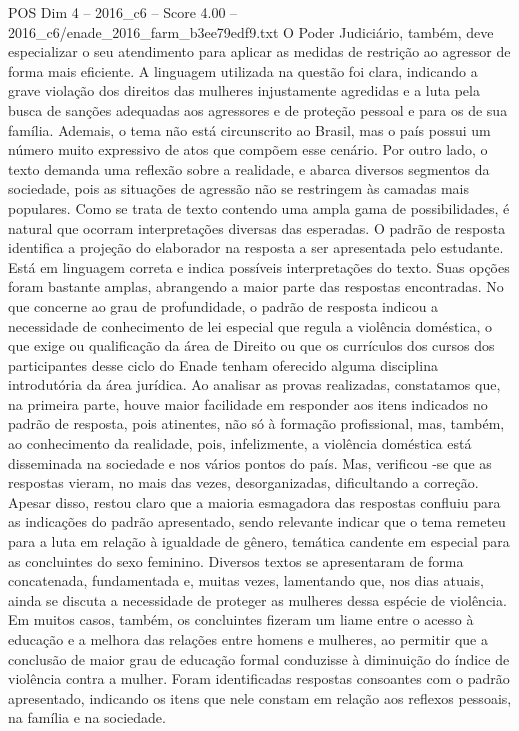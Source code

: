 \begin{textsample}{POS Dim 4 – 2016\_c6 – Score 4.00 – 2016\_c6/enade\_2016\_farm\_b3ee79edf9.txt}
O Poder Judiciário, também, deve especializar o seu atendimento para aplicar as medidas de restrição ao agressor de forma mais eficiente.
A linguagem utilizada na questão foi clara, indicando a grave violação dos direitos das mulheres injustamente agredidas e a luta pela busca de sanções adequadas aos agressores e de proteção pessoal e para os de sua família.
Ademais, o tema não está circunscrito ao Brasil, mas o país possui um número muito expressivo de atos que compõem esse cenário.
Por outro lado, o texto demanda uma reflexão sobre a realidade, e abarca diversos segmentos da sociedade, pois as situações de agressão não se restringem às camadas mais populares.
Como se trata de texto contendo uma ampla gama de possibilidades, é natural que ocorram interpretações diversas das esperadas.
O padrão de resposta identifica a projeção do elaborador na resposta a ser apresentada pelo estudante.
Está em linguagem correta e indica possíveis interpretações do texto.
Suas opções foram bastante amplas, abrangendo a maior parte das respostas encontradas.
No que concerne ao grau de profundidade, o padrão de resposta indicou a necessidade de conhecimento de lei especial que regula a violência doméstica, o que exige ou qualificação da área de Direito ou que os currículos dos cursos dos participantes desse ciclo do Enade tenham oferecido alguma disciplina introdutória da área jurídica.
Ao analisar as provas realizadas, constatamos que, na primeira parte, houve maior facilidade em responder aos itens indicados no padrão de resposta, pois atinentes, não só à formação profissional, mas, também, ao conhecimento da realidade, pois, infelizmente, a violência doméstica está disseminada na sociedade e nos vários pontos do país.
Mas, verificou -se que as respostas vieram, no mais das vezes, desorganizadas, dificultando a correção.
Apesar disso, restou claro que a maioria esmagadora das respostas confluiu para as indicações do padrão apresentado, sendo relevante indicar que o tema remeteu para a luta em relação à igualdade de gênero, temática candente em especial para as concluintes do sexo feminino.
Diversos textos se apresentaram de forma concatenada, fundamentada e, muitas vezes, lamentando que, nos dias atuais, ainda se discuta a necessidade de proteger as mulheres dessa espécie de violência.
Em muitos casos, também, os concluintes fizeram um liame entre o acesso à educação e a melhora das relações entre homens e mulheres, ao permitir que a conclusão de maior grau de educação formal conduzisse à diminuição do índice de violência contra a mulher.
Foram identificadas respostas consoantes com o padrão apresentado, indicando os itens que nele constam em relação aos reflexos pessoais, na família e na sociedade.

\end{textsample}
